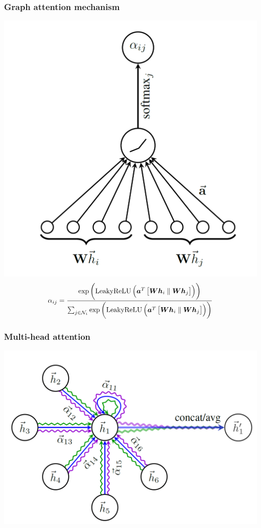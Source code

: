 \documentclass[compress]{beamer}
\begin{document}
\begin{frame}
  \frametitle{Graph attention mechanism}
  \begin{center}
    \includegraphics[scale=0.15]{attend.pdf}
    \begin{displaymath}
      \alpha_{ij}=\frac{\exp\left(\mathrm{LeakyReLU}\left(\vectorsym{a}^T\left[\matrixsym{W}\vectorsym{h}_i\parallel{}\matrixsym{W}\vectorsym{h}_j\right]\right)\right)}{\sum_{j\in\mathcal{N}_i}\exp\left(\mathrm{LeakyReLU}\left(\vectorsym{a}^T\left[\matrixsym{W}\vectorsym{h}_i\parallel{}\matrixsym{W}\vectorsym{h}_j\right]\right)\right)}
    \end{displaymath}
  \end{center}
\end{frame}

\begin{frame}
  \frametitle{Multi-head attention}
  \begin{center}
    \includegraphics[scale=0.3]{multi_head.pdf}
  \end{center}
\end{frame}
\end{document}
